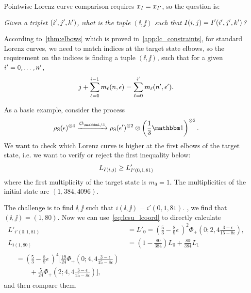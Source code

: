 Pointwise Lorenz curve comparison requires $x_{I} = x_{I'}$, so the question is: 
\begin{center}
\emph{Given a triplet $(i',j',k')$, what is the tuple $(\ii,\jj)$ such that $I(i,j) = I'(i',j',k')$?}
\end{center}

According to~\cref{thm:elbows} which is proved in~\cref{app:lc_constraints}, for standard Lorenz curves, we need to match indices at the target state elbows, so the requirement on the indices is finding a tuple $(\ii, \jj)$, such that for a given $i' = 0,\dots,n'$,
\begin{equation}
	j + \sum_{\ell=0}^{i-1} m_{\ell}(n, \epsilon) = \sum_{\ell=0}^{i'} m_{\ell}(n', \epsilon').
\end{equation}

As a basic example, consider the process 
\begin{equation}
\rho_{\rm{S}}(\epsilon)\too{4} \xrightarrow{\mathcal{O}_{\id/3}} \rho_{\rm{S}}(\epsilon')\too{2} \otimes \left( \frac{1}{3}\id \right)\too{2}.
\end{equation}
We want to check which Lorenz curve is higher at the first elbows of the target state, i.e. we want to verify or reject the first inequality below:
\begin{equation}
	L_{I(i,j)} \geq L'_{I'(0, 1, 81)}
\end{equation}
where the first multiplicity of the target state is $m_0 = 1$.
The multiplicities of the initial state are $(1, 384, 4096)$.

The challenge is to find $\ii,\jj$ such that $i(\ii,\jj) = i'(0,1,81)$.
, we find that $(\ii,\jj) = (1, 80)$.
Now we can use~\cref{eq:lcsu_lcoord} to directly calculate
\begin{align*}
	L'_{i'(0,1,81)} &= L'_0 = \left( \frac{5}{3} - \frac{8}{9}\epsilon\ \right)^2 \Phi_+\left(0;2,4\frac{3-\epsilon}{15-8\epsilon}\right), \\
	L_{i(1, 80)} &= \left(1-\frac{80}{384} \right) L_0 + \frac{80}{384} L_1 \\
	\begin{split}
	&= \left( \frac{5}{3} - \frac{8}{9}\epsilon\ \right)^4 \bigg[ \frac{19}{24} \Phi_+\left(0;4,4\frac{3-\epsilon}{15-8\epsilon}\right) \\ 
	&\qquad + \frac{5}{24}\Phi_+\left(2;4,4\frac{3-\epsilon}{15-8\epsilon}\right) \bigg],
	\end{split}
\end{align*}
and then compare them.

